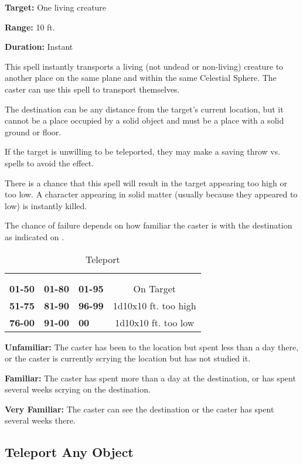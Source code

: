 \begin{multicols*}{2}
{\textbf{Target:} One living creature

\textbf{Range:} 10 ft.

\textbf{Duration:} Instant}

This spell instantly transports a living (not undead or non-living) creature to another place on the same plane and within the same Celestial Sphere. The caster can use this spell to transport themselves.

The destination can be any distance from the target’s current location, but it cannot be a place occupied by a solid object and must be a place with a solid ground or floor.

If the target is unwilling to be teleported, they may make a saving throw vs. spells to avoid the effect.

There is a chance that this spell will result in the target appearing too high or too low. A character appearing in solid matter (usually because they appeared to low) is instantly killed.

The chance of failure depends on how familiar the caster is with the destination as indicated on .

\begin {table}[H]
  \caption{Teleport}\label{tab:Teleport}
	\begin{tabularx}{\columnwidth}{>{\bfseries}Y>{\bfseries}Y>{\bfseries}Yc}
		 & \thead{}\\
	 &  &  & \\
	01-50 & 01-80 & 01-95 & On Target\\
	51-75 & 81-90 & 96-99 & 1d10x10 ft. too high\\
	76-00 & 91-00 & 00 & 1d10x10 ft. too low
  \end {tabularx}
\end {table}

\textbf{Unfamiliar:} The caster has been to the location but spent less than a day there, or the caster is currently scrying the location but has not studied it.

\textbf{Familiar:} The caster has spent more than a day at the destination, or has spent several weeks scrying on the destination.

\textbf{Very Familiar:} The caster can see the destination or the caster has spent several weeks there.

\subsection{Teleport Any Object}\label{spell:Teleport Any Object}
\end{multicols*}
